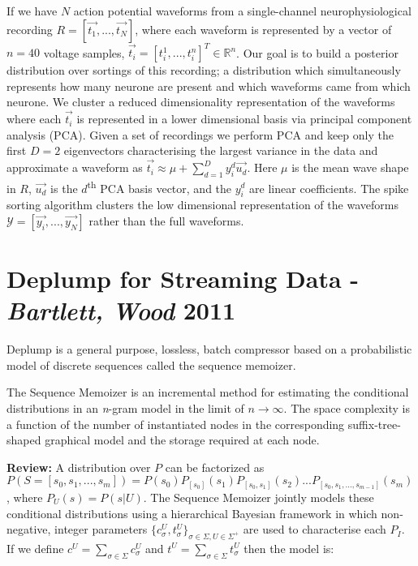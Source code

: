 If we have $N$ action potential waveforms from a single-channel neurophysiological recording $R=[\overrightarrow{t_{1}}, ..., \overrightarrow{t_{N}}]$, where each waveform is represented by a vector of $n=40$ voltage samples, $\overrightarrow{t_{i}}=[t_{i}^{1}, ..., t_{i}^{n}]^{T}\in \mathbb{R}^{n}$. Our goal is to build a posterior distribution over sortings of this recording; a distribution which simultaneously represents how many neurone are present and which waveforms came from which neurone. We cluster a reduced dimensionality representation of the waveforms where each $\overrightarrow{t_{i}}$ is represented in a lower dimensional basis via principal component analysis (PCA). Given a set of recordings we perform PCA and keep only the first $D=2$ eigenvectors characterising the largest variance in the data and approximate a waveform as $\overrightarrow{t_{i}}\approx \mu +\sum_{d=1}^{D}y_{i}^{d}\overrightarrow{u_{d}}$. Here $\mu$ is the mean wave shape in $R$, $\overrightarrow{u_{d}}$ is the $d$\textsuperscript{th} PCA basis vector, and the $y_{i}^{d}$ are linear coefficients. The spike sorting algorithm clusters the low dimensional representation of the waveforms $\mathcal{Y}=[\overrightarrow{y_{i}}, ..., \overrightarrow{y_{N}}]$ rather than the full waveforms.

\section{Deplump for Streaming Data - \textit{Bartlett, Wood} 2011}

Deplump is a general purpose, lossless, batch compressor based on a probabilistic model of discrete sequences called the sequence memoizer.

The Sequence Memoizer is an incremental method for estimating the conditional distributions in an \textit{n}-gram model in the limit of $n\to\infty$. The space complexity is a function of the number of instantiated nodes in the corresponding suffix-tree-shaped graphical model and the storage required at each node.

\textbf{Review:} A distribution over $P$ can be factorized as $P(S=[s_{0}, s_{1}, ..., s_{m}])=P(s_{0})P_{[s_{0}]}(s_{1})P_{[s_{0}, s_{1}]}(s_{2})...P_{[s_{0}, s_{1}, ..., s_{m-1}]}(s_{m})$, where $P_{U}(s)=P(s|U)$. The Sequence Memoizer jointly models these conditional distributions using a hierarchical Bayesian framework in which non-negative, integer parameters $\{c_{\sigma}^{U}, t_{\sigma}^{U}\}_{\sigma \in \Sigma, U \in \Sigma^{+}}$ are used to characterise each $P_{I}$. If we define $c^{U}=\sum_{\sigma\in\Sigma}c_{\sigma}^{U}$ and $t^{U}=\sum_{\sigma\in\Sigma}t_{\sigma}^{U}$ then the model is:

